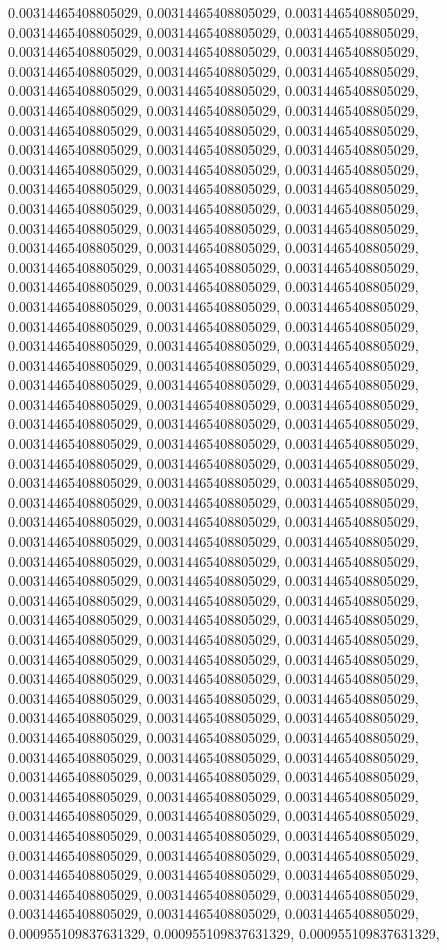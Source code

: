 \documentclass[
  ,man]{apa6}
\begin{document}
0.00314465408805029, 0.00314465408805029, 0.00314465408805029, 0.00314465408805029, 0.00314465408805029, 0.00314465408805029, 0.00314465408805029, 0.00314465408805029, 0.00314465408805029, 0.00314465408805029, 0.00314465408805029, 0.00314465408805029, 0.00314465408805029, 0.00314465408805029, 0.00314465408805029, 0.00314465408805029, 0.00314465408805029, 0.00314465408805029, 0.00314465408805029, 0.00314465408805029, 0.00314465408805029, 0.00314465408805029, 0.00314465408805029, 0.00314465408805029,
0.00314465408805029, 0.00314465408805029, 0.00314465408805029, 0.00314465408805029, 0.00314465408805029, 0.00314465408805029, 0.00314465408805029, 0.00314465408805029, 0.00314465408805029, 0.00314465408805029, 0.00314465408805029, 0.00314465408805029, 0.00314465408805029, 0.00314465408805029, 0.00314465408805029, 0.00314465408805029, 0.00314465408805029, 0.00314465408805029, 0.00314465408805029, 0.00314465408805029, 0.00314465408805029, 0.00314465408805029, 0.00314465408805029, 0.00314465408805029,
0.00314465408805029, 0.00314465408805029, 0.00314465408805029, 0.00314465408805029, 0.00314465408805029, 0.00314465408805029, 0.00314465408805029, 0.00314465408805029, 0.00314465408805029, 0.00314465408805029, 0.00314465408805029, 0.00314465408805029, 0.00314465408805029, 0.00314465408805029, 0.00314465408805029, 0.00314465408805029, 0.00314465408805029, 0.00314465408805029, 0.00314465408805029, 0.00314465408805029, 0.00314465408805029, 0.00314465408805029, 0.00314465408805029, 0.00314465408805029,
0.00314465408805029, 0.00314465408805029, 0.00314465408805029, 0.00314465408805029, 0.00314465408805029, 0.00314465408805029, 0.00314465408805029, 0.00314465408805029, 0.00314465408805029, 0.00314465408805029, 0.00314465408805029, 0.00314465408805029, 0.00314465408805029, 0.00314465408805029, 0.00314465408805029, 0.00314465408805029, 0.00314465408805029, 0.00314465408805029, 0.00314465408805029, 0.00314465408805029, 0.00314465408805029, 0.00314465408805029, 0.00314465408805029, 0.00314465408805029,
0.00314465408805029, 0.00314465408805029, 0.00314465408805029, 0.00314465408805029, 0.00314465408805029, 0.00314465408805029, 0.00314465408805029, 0.00314465408805029, 0.00314465408805029, 0.00314465408805029, 0.00314465408805029, 0.00314465408805029, 0.00314465408805029, 0.00314465408805029, 0.00314465408805029, 0.00314465408805029, 0.00314465408805029, 0.00314465408805029, 0.00314465408805029, 0.00314465408805029, 0.00314465408805029, 0.00314465408805029, 0.00314465408805029, 0.00314465408805029,
0.00314465408805029, 0.00314465408805029, 0.00314465408805029, 0.00314465408805029, 0.00314465408805029, 0.00314465408805029, 0.00314465408805029, 0.00314465408805029, 0.00314465408805029, 0.00314465408805029, 0.00314465408805029, 0.00314465408805029, 0.00314465408805029, 0.00314465408805029, 0.00314465408805029, 0.00314465408805029, 0.00314465408805029, 0.00314465408805029, 0.00314465408805029, 0.00314465408805029, 0.00314465408805029, 0.000955109837631329, 0.000955109837631329, 0.000955109837631329,
\end{document}
